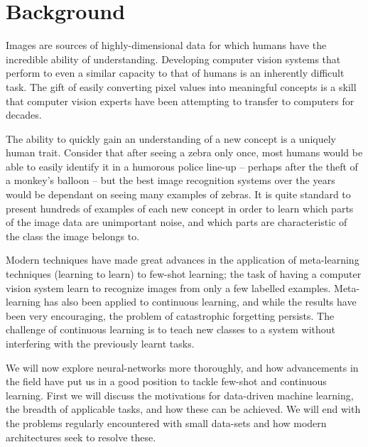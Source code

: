 \documentclass{report}
\begin{document}
\chapter{Background} \label{background:1}
Images are sources of highly-dimensional data for which humans have the incredible ability of understanding. Developing computer vision systems that perform to even a similar capacity to that of humans is an inherently difficult task. The gift of easily converting pixel values into meaningful concepts is a skill that computer vision experts have been attempting to transfer to computers for decades. \par
The ability to quickly gain an understanding of a new concept is a uniquely human trait. Consider that after seeing a zebra only once, most humans would be able to easily identify it in a humorous police line-up  -- perhaps after the theft of a monkey's balloon --  but the best image recognition systems over the years would be dependant on seeing many examples of zebras. It is quite standard to present hundreds of examples of each new concept in order to learn which parts of the image data are unimportant noise, and which parts are characteristic of the class the image belongs to. \par
Modern techniques have made great advances in the application of meta-learning techniques (learning to learn) to few-shot learning; the task of having a computer vision system learn to recognize images from only a few labelled examples. Meta-learning has also been applied to continuous learning, and while the results have been very encouraging, the problem of catastrophic forgetting persists. The challenge of continuous learning is to teach new classes to a system without interfering with the previously learnt tasks. \par
We will now explore neural-networks more thoroughly, and how advancements in the field have put us in a good position to tackle few-shot and continuous learning. First we will discuss the motivations for data-driven machine learning, the breadth of applicable tasks, and how these can be achieved. We will end with the problems regularly encountered with small data-sets and how modern architectures seek to resolve these. \par
\end{document}
